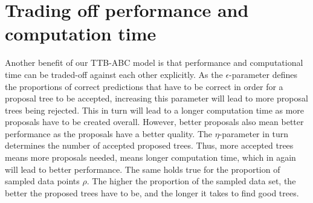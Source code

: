 \documentclass[a4paper,man, natbib]{apa6}
\begin{document}

\section{Trading off performance and computation time}
Another benefit of our TTB-ABC model is that performance and computational time can be traded-off against each other explicitly. As the $\epsilon$-parameter defines the proportions of correct predictions that have to be correct in order for a proposal tree to be accepted, increasing this parameter will lead to more proposal trees being rejected. This in turn will lead to a longer computation time as more proposals have to be created overall. However, better proposals also mean better performance as the proposals have a better quality. The $\eta$-parameter in turn determines the number of accepted proposed trees. Thus, more accepted trees means more proposals needed, means longer computation time, which in again will lead to better performance. The same holds true for the proportion of sampled data points $\rho$. The higher the proportion of the sampled data set, the better the proposed trees have to be, and the longer it takes to find good trees. 
\end{document}
